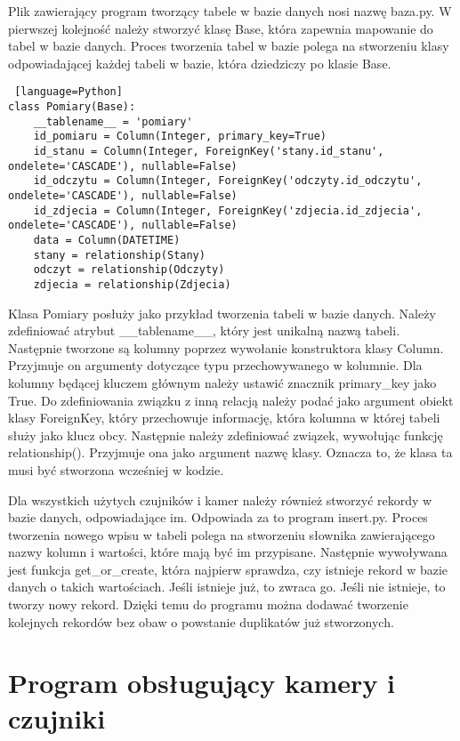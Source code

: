 \documentclass[a4paper,12pt,twoside]{article}
\begin{document}
Plik zawierający program tworzący tabele w bazie danych nosi nazwę baza.py. W pierwszej kolejność należy stworzyć klasę Base, która zapewnia mapowanie do tabel w bazie danych. Proces tworzenia tabel w bazie polega na stworzeniu klasy odpowiadającej każdej tabeli w bazie, która dziedziczy po klasie Base.
\begin{lstlisting} [language=Python]
class Pomiary(Base):
    __tablename__ = 'pomiary'
    id_pomiaru = Column(Integer, primary_key=True)
    id_stanu = Column(Integer, ForeignKey('stany.id_stanu', ondelete='CASCADE'), nullable=False)
    id_odczytu = Column(Integer, ForeignKey('odczyty.id_odczytu', ondelete='CASCADE'), nullable=False)
    id_zdjecia = Column(Integer, ForeignKey('zdjecia.id_zdjecia', ondelete='CASCADE'), nullable=False)
    data = Column(DATETIME)
    stany = relationship(Stany)
    odczyt = relationship(Odczyty)
    zdjecia = relationship(Zdjecia)
\end{lstlisting}
Klasa Pomiary posłuży jako przykład tworzenia tabeli w bazie danych. Należy zdefiniować atrybut {\_\_}tablename{\_\_}, który jest unikalną nazwą tabeli. Następnie tworzone są kolumny poprzez wywołanie konstruktora klasy Column. Przyjmuje on argumenty dotyczące typu przechowywanego w kolumnie. Dla kolumny będącej kluczem głównym należy ustawić znacznik primary{\_}key jako True. Do zdefiniowania związku z inną relacją należy podać jako argument obiekt klasy ForeignKey, który przechowuje informację, która kolumna w której tabeli służy jako klucz obcy. Następnie należy zdefiniować związek, wywołując funkcję relationship(). Przyjmuje ona jako argument nazwę klasy. Oznacza to, że klasa ta musi być stworzona wcześniej w kodzie.

Dla wszystkich użytych czujników i kamer należy również stworzyć rekordy w bazie danych, odpowiadające im. Odpowiada za to program insert.py. Proces tworzenia nowego wpisu w tabeli polega na stworzeniu słownika zawierającego nazwy kolumn i wartości, które mają być im przypisane. Następnie wywoływana jest funkcja get{\_}or{\_}create, która najpierw sprawdza, czy istnieje rekord w bazie danych o takich wartościach. Jeśli istnieje już, to zwraca go. Jeśli nie istnieje, to tworzy nowy rekord. Dzięki temu do programu można dodawać tworzenie kolejnych rekordów bez obaw o powstanie duplikatów już stworzonych.

\section{Program obsługujący kamery i czujniki}
\end{document}
